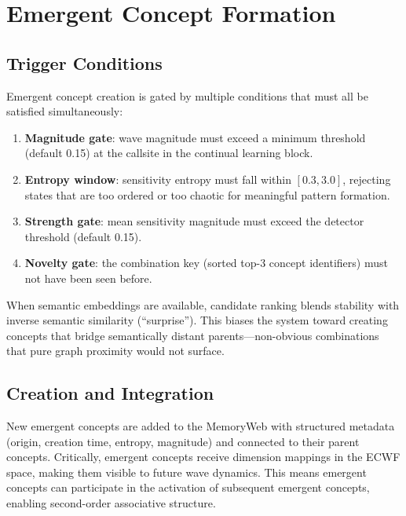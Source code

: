 \documentclass[11pt,a4paper]{article}
\begin{document}
\section{Emergent Concept Formation}

\subsection{Trigger Conditions}

Emergent concept creation is gated by multiple conditions that must all 
be satisfied simultaneously:

\begin{enumerate}[nosep]
    \item \textbf{Magnitude gate}: wave magnitude must exceed a minimum 
          threshold (default 0.15) at the callsite in the continual learning 
          block.
    \item \textbf{Entropy window}: sensitivity entropy must fall within 
          $[0.3, 3.0]$, rejecting states that are too ordered or too chaotic 
          for meaningful pattern formation.
    \item \textbf{Strength gate}: mean sensitivity magnitude must exceed the 
          detector threshold (default 0.15).
    \item \textbf{Novelty gate}: the combination key (sorted top-3 concept 
          identifiers) must not have been seen before.
\end{enumerate}

When semantic embeddings are available, candidate ranking blends stability 
with inverse semantic similarity (``surprise''). This biases the system 
toward creating concepts that bridge semantically distant parents---non-obvious 
combinations that pure graph proximity would not surface.

\subsection{Creation and Integration}

New emergent concepts are added to the MemoryWeb with structured metadata 
(origin, creation time, entropy, magnitude) and connected to their parent 
concepts. Critically, emergent concepts receive dimension mappings in the 
ECWF space, making them visible to future wave dynamics. This means 
emergent concepts can participate in the activation of subsequent emergent 
concepts, enabling second-order associative structure.
\end{document}
